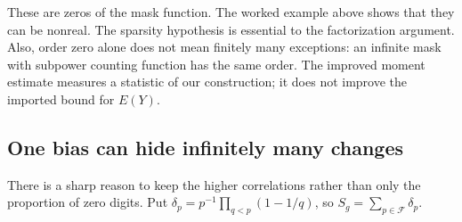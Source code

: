 These are zeros of the mask function.  The worked example above shows
that they can be nonreal.  The sparsity hypothesis is essential to the
factorization argument.
Also, order zero alone does not mean finitely many exceptions: an
infinite mask with subpower counting function has the same order.
The improved moment estimate measures a statistic of our
construction; it does not improve the imported bound for $E(Y)$.

\subsection{One bias can hide infinitely many changes}
\label{grw:collision-section}

There is a sharp reason to keep the higher correlations rather
than only the proportion of zero digits.  Put
$\delta_p=p^{-1}\prod_{q<p}(1-1/q)$, so
$S_g=\sum_{p\in\mathcal F}\delta_p$.


